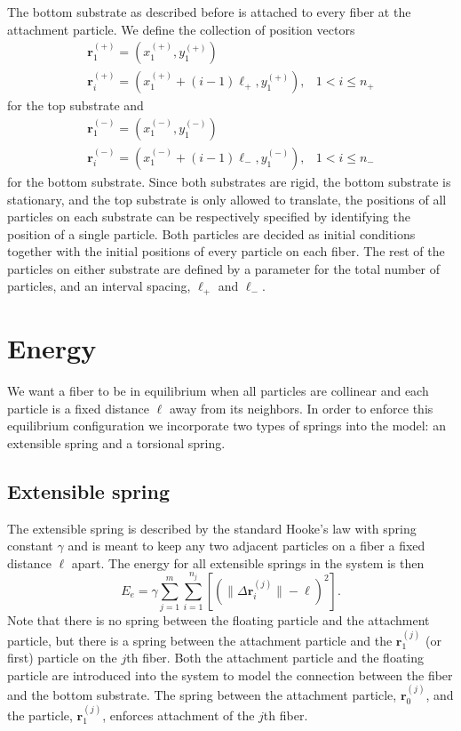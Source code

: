 The bottom substrate as described before is attached to every fiber at the attachment particle. We define the collection of position vectors
\begin{eqnarray}
	\textbf{r}_1^{(+)} = (x_1^{(+)},y_1^{(+)}) & \\
	\textbf{r}_i^{(+)} = (x_1^{(+)} + (i-1)\ell_+, y_1^{(+)}), & 1 < i \leq n_+
\end{eqnarray}
for the top substrate and
\begin{eqnarray}
	\textbf{r}_1^{(-)} = (x_1^{(-)},y_1^{(-)}) & \\
	\textbf{r}_i^{(-)} = (x_1^{(-)} + (i-1)\ell_-, y_1^{(-)}), & 1 < i \leq n_-
\end{eqnarray} 
for the bottom substrate. Since both substrates are rigid, the bottom substrate is stationary, and the top substrate is only allowed to translate, the positions of all particles on each substrate can be respectively specified by identifying the position of a single particle. Both particles are decided as initial conditions together with the initial positions of every particle on each fiber. The rest of the particles on either substrate are defined by a parameter for the total number of particles, and an interval spacing, $\ell_+$ and $\ell_-$.

\section{Energy}

We want a fiber to be in equilibrium when all particles are collinear and each particle is a fixed distance $\ell$ away from its neighbors. In order to enforce this equilibrium configuration we incorporate two types of springs into the model: an extensible spring and a torsional spring.

\subsection{Extensible spring}

The extensible spring is described by the standard Hooke's law with spring constant $\gamma$ and is meant to keep any two adjacent particles on a fiber a fixed distance $\ell$ apart. The energy for all extensible springs in the system is then
\begin{equation}
	E_e = \gamma \sum_{j=1}^m \sum_{i=1}^{n_j} \left[ \left( \|\Delta \textbf{r}_i^{(j)} \| - \ell \right)^2 \right].
\end{equation}
Note that there is no spring between the floating particle and the attachment particle, but there is a spring between the attachment particle and the $\textbf{r}_1^{(j)}$ (or first) particle on the $j$th fiber. Both the attachment particle and the floating particle are introduced into the system to model the connection between the fiber and the bottom substrate. The spring between the attachment particle, $\textbf{r}_0^{(j)}$, and the particle, $\textbf{r}_1^{(j)}$, enforces attachment of the $j$th fiber.

